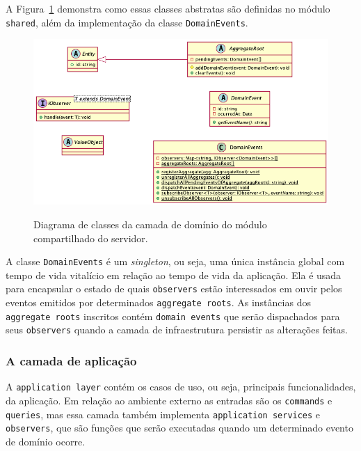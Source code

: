 A Figura~\ref{f.system_server_shared-module_domain} demonstra como essas classes abstratas são definidas no módulo \texttt{shared}, além da implementação da classe \texttt{DomainEvents}.

\begin{figure}[htbp]
	\caption{\small Diagrama de classes da camada de domínio do módulo compartilhado do servidor.}
	\centering
	\includegraphics[width=\textwidth]{../diagrams/out/system_server_shared-module_domain.png}
	\label{f.system_server_shared-module_domain}
\end{figure}

\FloatBarrier

A classe \texttt{DomainEvents} é um \emph{singleton}, ou seja, uma única instância global com tempo de vida vitalício em relação ao tempo de vida da aplicação. Ela é usada para encapsular o estado de quais \texttt{observers} estão interessados em ouvir pelos eventos emitidos por determinados \texttt{aggregate roots}. As instâncias dos \texttt{aggregate roots} inscritos contém \texttt{domain events} que serão dispachados para seus \texttt{observers} quando a camada de infraestrutura persistir as alterações feitas.

\subsubsection{A camada de aplicação}

A \texttt{application layer} contém os casos de uso, ou seja, principais funcionalidades, da aplicação. Em relação ao ambiente externo as entradas são os \texttt{commands} e \texttt{queries}, mas essa camada também implementa \texttt{application services} e \texttt{observers}, que são funções que serão executadas quando um determinado evento de domínio ocorre.

